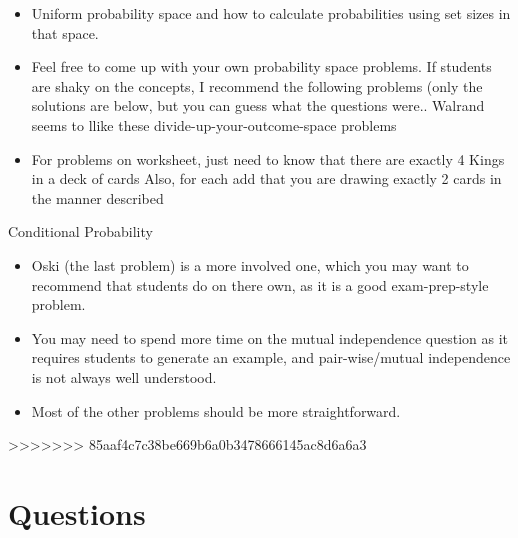 \documentclass{exam}
\begin{document}
\begin{questions}
\begin{itemize}
      \item Uniform probability space and how to calculate probabilities using set sizes in that space.
      \item Feel free to come up with your own probability space problems. If students are shaky on the concepts, I recommend the following problems (only the solutions are below, but you can guess what the questions were.. Walrand seems to llike these divide-up-your-outcome-space problems
      \item For problems on worksheet, just need to know that there are exactly 4 Kings in a deck of cards
            Also, for each add that you are drawing exactly 2 cards in the manner described
    \end{itemize}
  \item Conditional Probability
    \begin{itemize}
      \item Oski (the last problem) is a more involved one, which you may want to recommend that students do on there own, as it is a good exam-prep-style problem.
      \item You may need to spend more time on the mutual independence question as it requires students to generate an example, and pair-wise/mutual independence is not always well understood.
      \item Most of the other problems should be more straightforward.
    \end{itemize}
>>>>>>> 85aaf4c7c38be669b6a0b3478666145ac8d6a6a3
\end{questions}

\section{Questions}
\end{document}

